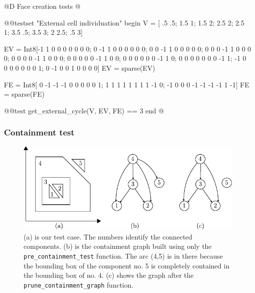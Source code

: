 @D Face creation tests
@{@@testset "External cell individuation" begin
    V = [ .5 .5;  1.5   1;  1.5  2; 
         2.5  2;  2.5   1;  3.5 .5;
         3.5  3;    2 2.5;   .5  3]

    EV = Int8[-1  1  0  0  0  0  0  0  0;
               0 -1  1  0  0  0  0  0  0;
               0  0 -1  1  0  0  0  0  0;
               0  0  0 -1  1  0  0  0  0;
               0  0  0  0 -1  1  0  0  0;
               0  0  0  0  0 -1  1  0  0;
               0  0  0  0  0  0 -1  1  0;
               0  0  0  0  0  0  0 -1  1;
              -1  0  0  0  0  0  0  0  1;
               0 -1  0  0  1  0  0  0  0]
    EV = sparse(EV)
    
    FE = Int8[ 0 -1 -1 -1  0  0  0  0  0  1;
               1  1  1  1  1  1  1  1 -1  0;
              -1  0  0  0 -1 -1 -1 -1  1 -1]
    FE = sparse(FE)

    @@test get_external_cycle(V, EV, FE) == 3
end
@}

\subsubsection{Containment test}
\label{sec:conttest_test}

\begin{figure}[h]
    \centering
    \includegraphics{./img/ch2-containmenttest.pdf}
    \caption{(a) is our test case. The numbers identify the connected components. 
        (b) is the containment graph built using only the \texttt{pre\_containment\_test} 
        function. The arc (4,5) is in there because the bounding box of the component 
        no. 5 is completely contained in the bounding box of no. 4. (c) shows 
        the graph after the \texttt{prune\_containment\_graph} function.}
\end{figure}


